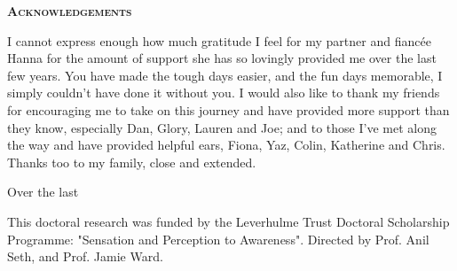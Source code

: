 \pagestyle{empty}%
\begin{center}
	\Huge \textsc{\textbf{Acknowledgements}}
	\hrulefill
\end{center}

I cannot express enough how much gratitude I feel for my partner and fiancée Hanna for the amount of support she has so lovingly provided me over the last few years. You have made the tough days easier, and the fun days memorable, I simply couldn't have done it without you. I would also like to thank my friends for encouraging me to take on this journey and have provided more support than they know, especially Dan, Glory, Lauren and Joe; and to those I've met along the way and have provided helpful ears, Fiona, Yaz, Colin, Katherine and Chris. Thanks too to my family, close and extended.

Over the last 


This doctoral research was funded by the Leverhulme Trust Doctoral Scholarship Programme: "Sensation and Perception to Awareness". Directed by Prof. Anil Seth, and Prof. Jamie Ward.

